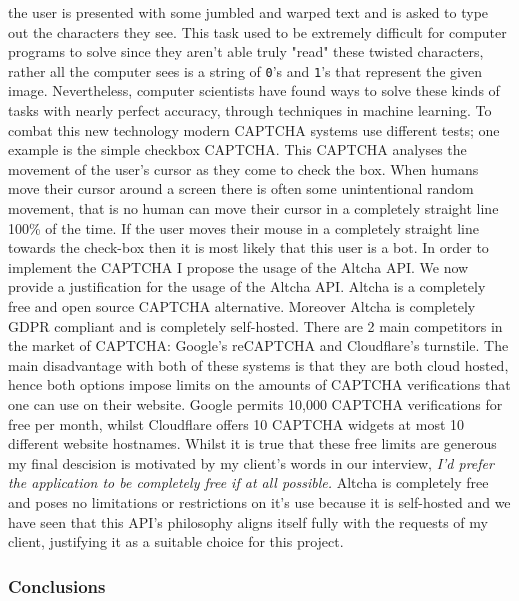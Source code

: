 the user is presented with some jumbled and warped text and is
asked to type out the characters they see. This task used to 
be extremely difficult for computer programs to solve since 
they aren't able truly "read" these twisted characters, rather
all the computer sees is a string of \texttt{0}'s and
\texttt{1}'s that represent the given image. Nevertheless, 
computer scientists have found ways to solve these kinds of 
tasks with nearly perfect accuracy, through techniques in 
machine learning. To combat this new technology modern CAPTCHA
systems use different tests; one example is the simple 
checkbox CAPTCHA. This CAPTCHA analyses the movement of the 
user's cursor as they come to check the box. When humans move 
their cursor around a screen there is often some unintentional
random movement, that is no human can move their cursor in a 
completely straight line 100\% of the time. If the user moves 
their mouse in a completely straight line towards the
check-box then it is most likely that this user is a bot. In 
order to implement the CAPTCHA I propose the usage of the 
Altcha API. We now provide a justification for the usage of
the Altcha API. Altcha is a completely free and open source
CAPTCHA alternative. Moreover Altcha is completely GDPR 
compliant and is completely self-hosted. There are 2 main 
competitors in the market of CAPTCHA: Google's reCAPTCHA and
Cloudflare's turnstile. The main disadvantage with both of 
these systems is that they are both cloud hosted, hence both 
options impose limits on the amounts of CAPTCHA verifications 
that one can use on their website. Google permits
10,000 CAPTCHA verifications for free per month, whilst
Cloudflare offers 10 CAPTCHA widgets at most 10 different 
website hostnames. Whilst it is true that these free limits 
are generous my final descision is motivated by my client's 
words in our interview, \textit{I'd prefer the application to
be completely free if at all possible.} Altcha is completely
free and poses no limitations or restrictions on it's use 
because it is self-hosted and we have seen that this API's 
philosophy aligns itself fully with the requests of my
client, justifying it as a suitable choice for this project.

\subsubsection{Conclusions}

